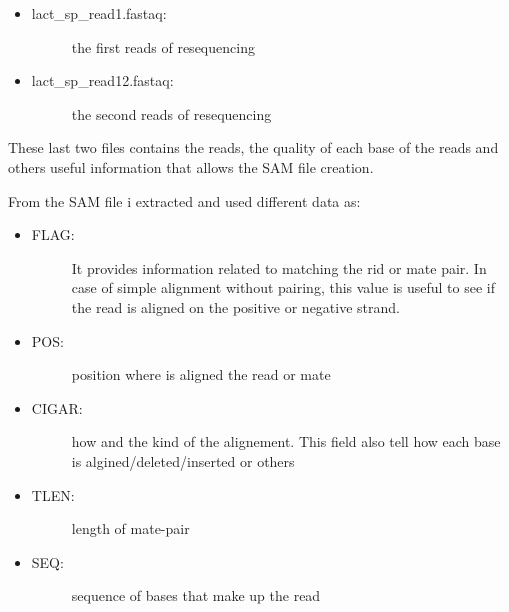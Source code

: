 \begin{itemize}
\item \begin{description}
		\item[lact\_sp\_read1.fastaq:] the first reads of resequencing
	  \end{description}
\end{itemize}

\begin{itemize}
\item \begin{description}
		\item[lact\_sp\_read12.fastaq:] the second reads of resequencing
	  \end{description}
\end{itemize}
  
These last two files contains the reads, the quality of each base of the reads and others useful information that allows the SAM file creation.

From the SAM file i extracted and used different data as:

\begin{itemize}
\item \begin{description}
		\item[FLAG:] It provides information related to matching the rid or mate pair. In case of simple alignment without pairing, this value is useful to see if the read is aligned on the positive or negative strand.
	  \end{description}
\end{itemize}


\begin{itemize}
\item \begin{description}
		\item[POS:] position where is aligned the read or mate
		  \end{description}
\end{itemize}

\begin{itemize}
\item \begin{description}
		\item[CIGAR:] how and the kind of the alignement. This field also tell how each base is algined/deleted/inserted or others
  \end{description}
\end{itemize}
\begin{itemize}
\item \begin{description}
		\item[TLEN:] length of mate-pair
		  \end{description}
\end{itemize}
\begin{itemize}
\item \begin{description}
		\item[SEQ:] sequence of bases that make up the read
  \end{description}
\end{itemize}


